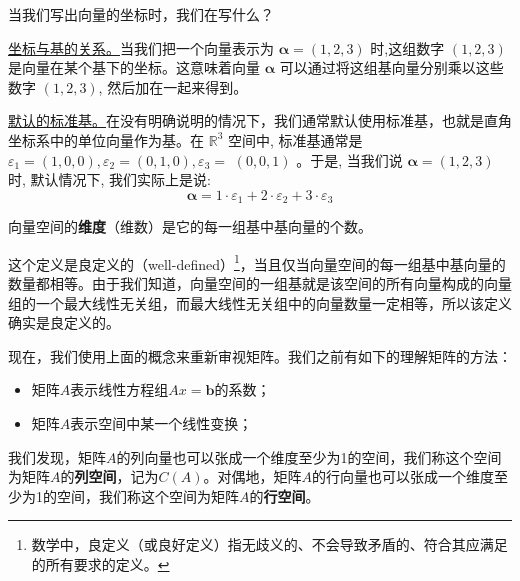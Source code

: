 \vspace{0.3cm}

\begin{note}
    当我们写出向量的坐标时，我们在写什么？
    
    \underline{坐标与基的关系。}当我们把一个向量表示为 $\boldsymbol{\alpha}=(1,2,3)$ 时,这组数字 $(1,2,3)$ 是向量在某个基下的坐标。这意味着向量 $\boldsymbol{\alpha}$ 可以通过将这组基向量分别乘以这些数字 $(1,2,3)$, 然后加在一起来得到。

    \underline{默认的标准基。}在没有明确说明的情况下，我们通常默认使用标准基，也就是直角坐标系中的单位向量作为基。在 $\mathbb{R}^3$ 空间中, 标准基通常是 $\varepsilon_1=(1,0,0), \varepsilon_2=(0,1,0), \varepsilon_3=$ $(0,0,1)$ 。于是, 当我们说 $\boldsymbol{\alpha}=(1,2,3)$ 时, 默认情况下, 我们实际上是说:
    $$
    \boldsymbol{\alpha}=1 \cdot \varepsilon_1+2 \cdot \varepsilon_2+3 \cdot \varepsilon_3
    $$
\end{note}

\vspace{0.3cm}

\begin{definition}[向量空间的维度]
    向量空间的\textcolor{third}{\bf 维度}（维数）是它的每一组基中基向量的个数。
\end{definition}

这个定义是良定义的（well-defined）\footnote{数学中，良定义（或良好定义）指无歧义的、不会导致矛盾的、符合其应满足的所有要求的定义。}，当且仅当向量空间的每一组基中基向量的数量都相等。由于我们知道，向量空间的一组基就是该空间的所有向量构成的向量组的一个最大线性无关组，而最大线性无关组中的向量数量一定相等，所以该定义确实是良定义的。

现在，我们使用上面的概念来重新审视矩阵。我们之前有如下的理解矩阵的方法：

\begin{itemize}
    \item 矩阵$A$表示线性方程组$Ax=\boldsymbol{b}$的系数；
    \item 矩阵$A$表示空间中某一个线性变换；
\end{itemize}

我们发现，矩阵$A$的列向量也可以张成一个维度至少为1的空间，我们称这个空间为矩阵$A$的\textcolor{third}{\bf 列空间}，记为$C(A)$。对偶地，矩阵$A$的行向量也可以张成一个维度至少为1的空间，我们称这个空间为矩阵$A$的\textcolor{third}{\bf 行空间}。

